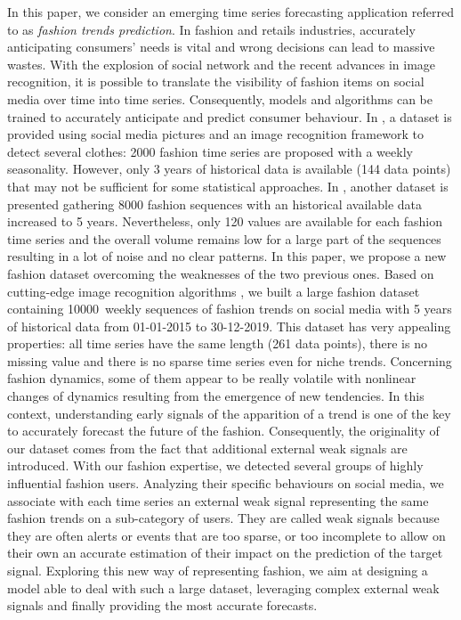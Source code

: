 \documentclass[10pt]{article} %
\newcommand{\numberts}{10000}
\begin{document}
In this paper, we consider an emerging time series forecasting application referred to as {\em fashion trends prediction}. In fashion and retails industries, accurately anticipating consumers' needs is vital and wrong decisions can lead to massive wastes. With the explosion of social network and the recent advances in image recognition, it is possible to translate the visibility of fashion items on social media over time into time series. Consequently, models and algorithms can be trained to accurately anticipate and predict consumer behaviour. In \citet{ma2020}, a  dataset is provided using social media pictures and an image recognition framework to detect several clothes: 2000 fashion time series are proposed with a weekly seasonality. However, only 3 years of historical data is available (144 data points) that may not be sufficient for some statistical approaches. In \citet{ma2020}, another dataset is presented gathering 8000 fashion sequences with an historical available data  increased to 5 years. Nevertheless, only 120 values are available for each fashion time series and the overall volume remains low for a large part of the sequences resulting in a lot of noise and no clear patterns. In this paper, we propose a new fashion dataset overcoming the weaknesses of the two previous ones. Based on cutting-edge image recognition algorithms \citep{ren2015,chollet2017}, we built a large fashion dataset containing \numberts\ weekly sequences of fashion trends on social media with 5 years of historical data from 01-01-2015 to 30-12-2019. This dataset has very appealing properties:  all time series have the same length (261 data points), there is no missing value and there is no sparse time series even for niche trends. Concerning fashion dynamics, some of them appear to be really volatile with nonlinear changes of dynamics resulting from the emergence of new tendencies. In this context, understanding early signals of the apparition of a trend is one of the key to accurately forecast the future of the fashion. Consequently, the originality of our dataset comes from the fact that additional external weak signals are introduced. With our fashion expertise, we detected several groups of highly influential fashion users. Analyzing their specific behaviours on social media, we associate with each time series an external weak signal representing the same fashion trends on a sub-category of users. They are called weak signals because they are often alerts or events that are too sparse, or too incomplete to allow on their own an accurate estimation of their impact on the prediction of the target signal. Exploring this new way of representing fashion, we aim at designing a model able to deal with such a large dataset, leveraging  complex external weak signals and finally providing the most accurate forecasts.
 
\end{document}

